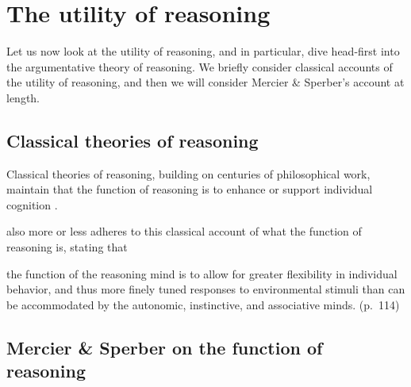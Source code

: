 \section{The utility of reasoning}

Let us now look at the utility of reasoning, and in particular, dive head-first into the argumentative theory of reasoning.
We briefly consider classical accounts of the utility of reasoning, and then we will consider Mercier \& Sperber's account at length.

\subsection{Classical theories of reasoning}


Classical theories of reasoning, building on centuries of philosophical work, maintain that the function of reasoning is to enhance or support individual cognition \citep{MS11}.



\citet{Goel22} also more or less adheres to this classical account of what the function of reasoning is, stating that
\begin{quoting}
    the function of the reasoning mind is to allow for greater flexibility in individual behavior, and thus more finely tuned responses to environmental stimuli than can be accommodated by the autonomic, instinctive, and associative minds.
    \hfill (p.~114)
\end{quoting}

\subsection{Mercier \& Sperber on the function of reasoning}


